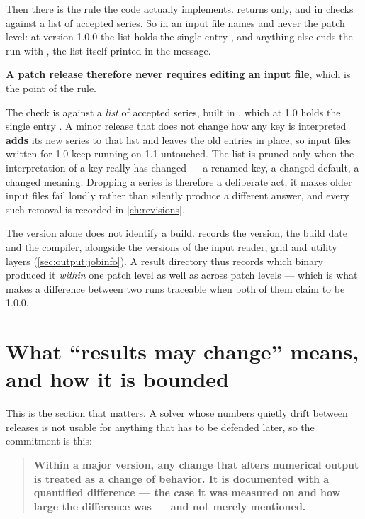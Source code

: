 Then there is the rule the code actually implements.
 returns  only, and
 in  checks
 against a list of accepted series. So  in an input file names
 and never the patch level: at version 1.0.0 the list holds
the single entry , and anything else ends the run with
, the list itself printed in
the message.

\textbf{A patch release therefore never requires editing an input file}, which
is the point of the rule.

\begin{note}
  The check is against a \emph{list} of accepted series, built in
  , which at 1.0 holds the single entry
  . A minor release that does not change how any key is
  interpreted \textbf{adds} its new series to that list and leaves the old
  entries in place, so input files written for 1.0 keep running on 1.1
  untouched. The list is pruned only when the interpretation of a key really
  has changed --- a renamed key, a changed default, a changed meaning. Dropping
  a series is therefore a deliberate act, it makes older input files fail
  loudly rather than silently produce a different answer, and every such
  removal is recorded in \cref{ch:revisions}.
\end{note}

The version alone does not identify a build.  records the
version, the build date and the compiler, alongside the versions of the input
reader, grid and utility layers (\cref{sec:output:jobinfo}). A result directory
thus records which binary produced it \emph{within} one patch level as well as
across patch levels --- which is what makes a difference between two runs
traceable when both of them claim to be 1.0.0.

\section{What ``results may change'' means, and how it is bounded}
\label{sec:policy:results}

This is the section that matters. A solver whose numbers quietly drift between
releases is not usable for anything that has to be defended later, so the
commitment is this:

\begin{quote}
  \textbf{Within a major version, any change that alters numerical output is
  treated as a change of behavior. It is documented with a quantified
  difference --- the case it was measured on and how large the difference was
  --- and not merely mentioned.}
\end{quote}

